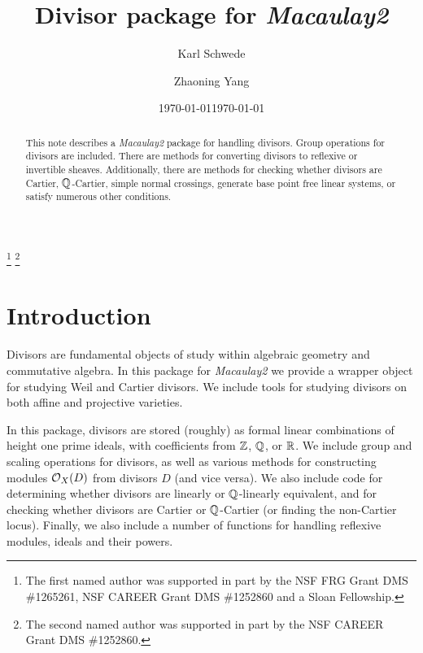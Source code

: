 \documentclass[11pt]{amsart}
\begin{document}
\title{{Divisor} package for \emph{Macaulay2}}
\author{Karl Schwede}
\date{\today}
\address{Department of Mathematics, University of Utah, 155 S 1400 E Room 233, Salt Lake City, UT, 84112}

\author{Zhaoning Yang}
\date{\today}							%
\address{Department of Mathematics, Pennsylvania State University, State College, PA, 16802}

\begin{abstract}
This note describes a \emph{Macaulay2} package for handling divisors.  Group operations for divisors are included.  There are methods for converting divisors to reflexive or invertible sheaves.  Additionally, there are methods for checking whether divisors are Cartier, $\mathbb{Q}$-Cartier, simple normal crossings, generate base point free linear systems, or satisfy numerous other conditions.
\end{abstract}




\thanks{The first named author was supported in part by the
  NSF FRG Grant DMS \#1265261, NSF CAREER Grant DMS \#1252860 and a Sloan
  Fellowship.}
\thanks{The second named author was supported in part by the NSF CAREER Grant DMS \#1252860.}
\maketitle

\section{Introduction}

Divisors are fundamental objects of study within algebraic geometry and commutative algebra.  In this package for \emph{Macaulay2} \cite{M2} we provide a wrapper object for studying Weil and Cartier divisors.  We include tools for studying divisors on both affine and projective varieties.

In this package, divisors are stored (roughly) as formal linear combinations of height one prime ideals, with coefficients from $\mathbb{Z}$, $\mathbb{Q}$, or $\mathbb{R}$.  We include group and scaling operations for divisors, as well as various methods for constructing modules $\mbox{$\mathcal{O}$}_X(D)$ from divisors $D$ (and vice versa).  We also include code for determining whether divisors are linearly or $\mathbb{Q}$-linearly equivalent, and for checking whether divisors are Cartier or $\mathbb{Q}$-Cartier (or finding the non-Cartier locus).  Finally, we also include a number of functions for handling reflexive modules, ideals and their powers.
\end{document}
